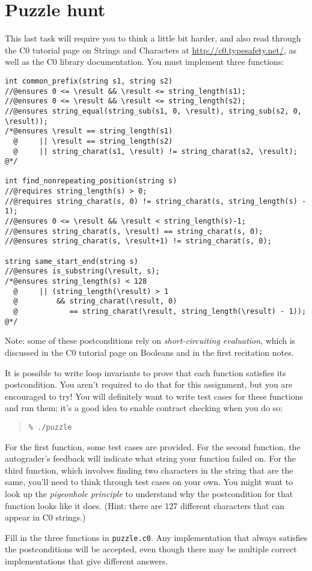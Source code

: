 \documentclass[12pt]{exam}
\begin{document}
\newpage
\section{Puzzle hunt}

This last task will require you to think a little bit harder, and also
read through the C0 tutorial page on Strings and Characters at
\url{http://c0.typesafety.net/}, as well as the C0 library
documentation. You must implement three functions:
\begin{lstlisting}[basicstyle=\smallbasicstyle]
int common_prefix(string s1, string s2)
//@ensures 0 <= \result && \result <= string_length(s1);
//@ensures 0 <= \result && \result <= string_length(s2);
//@ensures string_equal(string_sub(s1, 0, \result), string_sub(s2, 0, \result));
/*@ensures \result == string_length(s1)
  @     || \result == string_length(s2)
  @     || string_charat(s1, \result) != string_charat(s2, \result); @*/

int find_nonrepeating_position(string s)
//@requires string_length(s) > 0;
//@requires string_charat(s, 0) != string_charat(s, string_length(s) - 1);
//@ensures 0 <= \result && \result < string_length(s)-1;
//@ensures string_charat(s, \result) == string_charat(s, 0);
//@ensures string_charat(s, \result+1) != string_charat(s, 0);

string same_start_end(string s)
//@ensures is_substring(\result, s);
/*@ensures string_length(s) < 128
  @     || (string_length(\result) > 1
  @         && string_charat(\result, 0)
  @            == string_charat(\result, string_length(\result) - 1)); @*/
\end{lstlisting}
Note: some of these postconditions rely on \emph{short-circuiting
  evaluation}, which is discussed in the C0 tutorial page on Booleans
and in the first recitation notes.

It is possible to write loop invariants to prove that each function
satisfies its postcondition. You aren't required to do that for this
assignment, but you are encouraged to try!
You will definitely want to write test cases for these functions and
run them; it's a good idea to enable contract checking when you do so:
\begin{quote}
\begin{lstlisting}[language={[coin]C}]
% cc0 -d -o puzzle puzzle.c0 puzzle-test.c0
% ./puzzle
\end{lstlisting}
\end{quote}
For the first function, some test cases are provided. For the second
function, the autograder's feedback will indicate what string your
function failed on. For the third function, which involves finding two
characters in the string that are the same, you'll need to think
through test cases on your own. You might want to look up the
\emph{pigeonhole principle} to understand why the postcondition for
that function looks like it does. (Hint: there are 127 different
characters that can appear in C0 strings.)

\begin{task}[12]
Fill in the three functions in \lstinline'puzzle.c0'. Any implementation
that always satisfies the postconditions will be accepted, even though
there may be multiple correct implementations that give different
answers.
\end{task}
\end{document}
